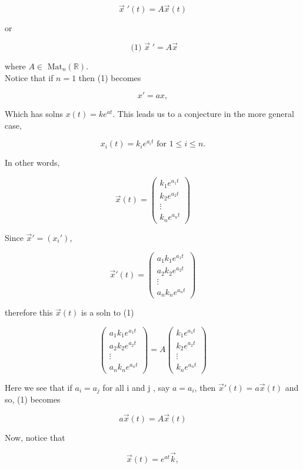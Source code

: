 \[ \vec{x} \;'(t) = A \vec{x}(t) \]

or

\[ \text{ (1) } \vec{x} \;' = A \vec{x} \]

where \( A \in \text{ Mat}_n ( \mathbb{R})  \). \\

Notice that if \( n = 1 \) then (1) becomes 

\[ x' = ax, \]

Which has solns  \( x(t) = ke^{at}. \) This leads us to a conjecture in
the more general case, 

\[ x_i(t) = k_ie^{a_it} \text{ for } 1 \leq i \leq n.\]

In other words, 

\[ \vec{x}(t) =
\begin{pmatrix}
  k_1e^{a_1t} \\
  k_2e^{a_2t} \\
  \vdots \\
  k_ne^{a_nt} 
\end{pmatrix}\]

Since \( \vec{x}' = (x_i') \), 

\[ \vec{x}'(t) =
\begin{pmatrix}
  a_1k_1e^{a_1t} \\
  a_2k_2e^{a_2t} \\
  \vdots \\
  a_nk_ne^{a_nt} 
\end{pmatrix}\]

therefore this \( \vec{x}(t) \) is a soln to (1) \iff

\[ 
\begin{pmatrix}
  a_1k_1e^{a_1t} \\
  a_2k_2e^{a_2t} \\
  \vdots \\
  a_nk_ne^{a_nt} 
\end{pmatrix}
=A
\begin{pmatrix}
  k_1e^{a_1t} \\
  k_2e^{a_2t} \\
  \vdots \\
  k_ne^{a_nt} 
\end{pmatrix}
\]

Here we see that if \( a_i = a_j \) for all i and j , say \( a = a_i\), then
\( \vec{x}'(t) = a\vec{x}(t) \) and so, (1) becomes 

\[ a\vec{x}(t) = A\vec{x}(t) \]

Now, notice that 

\[ \vec{x}(t) = e^{at}\vec{k}, \]


